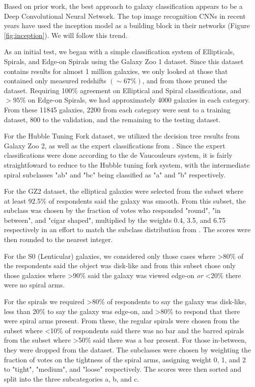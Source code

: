\documentclass{article}
\begin{document}
Based on prior work, the best approach to galaxy classification appears to be a Deep Convolutional Neural Network. The top image recognition CNNs in recent years have used the inception model \citep{2014arXiv1409.4842S} as a building block in their networks (Figure \ref{fig:inception}). We will follow this trend.

As an initial test, we began with a simple classification system of Ellipticals, Spirals, and Edge-on Spirals using the Galaxy Zoo 1 dataset. Since this dataset contains results for almost 1 million galaxies, we only looked at those that contained only measured redshifts $(\sim 67\%)$, and from those pruned the dataset. Requiring 100\% agreement on Elliptical and Spiral classifications, and $>95\%$ on Edge-on Spirals, we had approximately 4000 galaxies in each category. From these 11845 galaxies, 2200 from each category were sent to a training dataset, 800 to the validation, and the remaining to the testing dataset.

For the Hubble Tuning Fork dataset, we utilized the decision tree results from Galaxy Zoo 2, as well as the expert classifications from \cite{2010ApJS..186..427N}. Since the expert classifications were done according to the de Vaucouleurs system, it is fairly straightfoward to reduce to the Hubble tuning fork system, with the intermediate spiral subclasses "ab" and "bc" being classified as "a" and "b" respectively. 

For the GZ2 dataset, the elliptical galaxies were selected from the subset where at least 92.5\% of respondents said the galaxy was smooth. From this subset, the subclass was chosen by the fraction of votes who responded "round", "in between", and "cigar shaped", multiplied by the weights 0.4, 3.5, and 6.75 respectively in an effort to match the subclass distribution from \cite{2010ApJS..186..427N}. The scores were then rounded to the nearest integer.

For the S0 (Lenticular) galaxies, we considered only those cases where >80\% of the respondents said the object was disk-like and from this subset chose only those galaxies where >90\% said the galaxy was viewed edge-on \emph{or} <20\% there were no spiral arms.

For the spirals we required >80\% of respondents to say the galaxy was disk-like, less than 20\% to say the galaxy was edge-on, and >80\% to respond that there were spiral arms present. From these, the regular spirals were chosen from the subset where <10\% of respondents said there was no bar and the barred spirals from the subset where >50\% said there was a bar present. For those in-between, they were dropped from the dataset. The subclasses were chosen by weighting the fraction of votes on the tightness of the spiral arms, assigning weight 0, 1, and 2 to "tight", "medium", and "loose" respectively. The scores were then sorted and split into the three subcategories a, b, and c.
\end{document}
